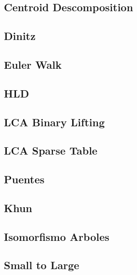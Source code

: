 \subsection{   Centroid Descomposition}
\raggedbottom
\hrulefill
\subsection{   Dinitz}
\raggedbottom
\hrulefill
\subsection{   Euler Walk}
\raggedbottom
\hrulefill
\subsection{   HLD}
\raggedbottom
\hrulefill
\subsection{   LCA Binary Lifting}
\raggedbottom
\hrulefill
\subsection{   LCA Sparse Table}
\raggedbottom
\hrulefill
\subsection{   Puentes}
\raggedbottom
\hrulefill
\subsection{   Khun}
\raggedbottom
\hrulefill
\subsection{   Isomorfismo Arboles}
\raggedbottom
\hrulefill
\subsection{   Small to Large}
\raggedbottom
\hrulefill
